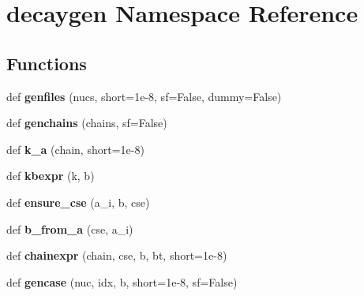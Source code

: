 \hypertarget{namespacedecaygen}{}\section{decaygen Namespace Reference}
\label{namespacedecaygen}
\subsection*{Functions}
\begin{DoxyCompactItemize}
\item 
def {\bfseries genfiles} (nucs, short=1e-\/8, sf=\+False, dummy=\+False)\hypertarget{namespacedecaygen_a56d1f33cb18153f5e53e7cd40a13d750}{}\label{namespacedecaygen_a56d1f33cb18153f5e53e7cd40a13d750}

\item 
def {\bfseries genchains} (chains, sf=False)\hypertarget{namespacedecaygen_add2576d70a319652092870680a494f61}{}\label{namespacedecaygen_add2576d70a319652092870680a494f61}

\item 
def {\bfseries k\+\_\+a} (chain, short=1e-\/8)\hypertarget{namespacedecaygen_a88bdb6c9de948e3c5703f3c79d32fef7}{}\label{namespacedecaygen_a88bdb6c9de948e3c5703f3c79d32fef7}

\item 
def {\bfseries kbexpr} (k, b)\hypertarget{namespacedecaygen_ae12456305bbca70051414091248b04f2}{}\label{namespacedecaygen_ae12456305bbca70051414091248b04f2}

\item 
def {\bfseries ensure\+\_\+cse} (a\+\_\+i, b, cse)\hypertarget{namespacedecaygen_a0672d52bd4f1ca8b41ae19fe4758fc8b}{}\label{namespacedecaygen_a0672d52bd4f1ca8b41ae19fe4758fc8b}

\item 
def {\bfseries b\+\_\+from\+\_\+a} (cse, a\+\_\+i)\hypertarget{namespacedecaygen_add28ab2ef61e66bee845086c813c3a3b}{}\label{namespacedecaygen_add28ab2ef61e66bee845086c813c3a3b}

\item 
def {\bfseries chainexpr} (chain, cse, b, bt, short=1e-\/8)\hypertarget{namespacedecaygen_a60ae938778337bff4a44edf669cdef07}{}\label{namespacedecaygen_a60ae938778337bff4a44edf669cdef07}

\item 
def {\bfseries gencase} (nuc, idx, b, short=1e-\/8, sf=\+False)\hypertarget{namespacedecaygen_aec7f63f59508fce1577af06c2c75d3a2}{}\label{namespacedecaygen_aec7f63f59508fce1577af06c2c75d3a2}


\end{DoxyCompactItemize}
